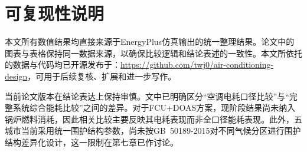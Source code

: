 \appendix
\section{可复现性说明}

本文所有数值结果均直接来源于EnergyPlus仿真输出的统一整理结果。论文中的图表与表格保持同一数据来源，以确保比较逻辑和结论表述的一致性。本文所依托的数据与代码均已开源发布于：\url{https://github.com/twj0/air-conditioning-design}，可用于后续复核、扩展和进一步写作。

当前论文版本在结论表达上保持审慎。文中已明确区分“空调电耗口径比较”与“完整系统综合能耗比较”之间的差异。对于FCU+DOAS方案，现阶段结果尚未纳入锅炉燃料消耗，因此相关比较主要反映其电耗表现而非全口径能耗表现。此外，五城市当前采用统一围护结构参数，尚未按GB~50189-2015对不同气候分区进行围护结构差异化设计，这一限制在第七章已作讨论。
